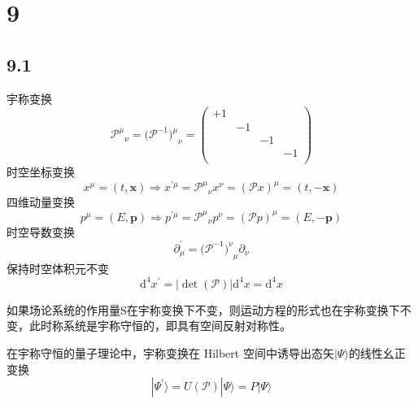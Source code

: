 \section{9}
\subsection{9.1}

宇称变换
\begin{equation}
    {\mathcal{P} ^{\mu}}_{\nu}=(\mathcal{P} ^{-1}{)^{\mu}}_{\nu}=\left( \begin{matrix}
	+1&		&		&		\\
	&		-1&		&		\\
	&		&		-1&		\\
	&		&		&		-1\\
\end{matrix} \right) 
\end{equation}
时空坐标变换
\begin{equation}
    x^{\mu}=\left( t,\mathbf{x} \right) \Rightarrow x^{\prime \mu}={\mathcal{P} ^{\mu}}_{\nu}x^{\nu}=(\mathcal{P} x)^{\mu}=\left( t,-\mathbf{x} \right) 
\end{equation}
四维动量变换
\begin{equation}
    p^{\mu}=\left( E,\mathbf{p} \right) \Rightarrow p^{\prime \mu}={\mathcal{P} ^{\mu}}_{\nu}p^{\nu}=(\mathcal{P} p)^{\mu}=\left( E,-\mathbf{p} \right) 
\end{equation}
时空导数变换
\begin{equation}
    \partial _{\mu}^{\prime}=(\mathcal{P} ^{-1}{)^{\nu}}_{\mu}\partial _{\nu}
\end{equation}
保持时空体积元不变
\begin{equation}
    \mathrm{d}^4x^{\prime}=\left| \det \left( \mathcal{P} \right) \right|\mathrm{d}^4x=\mathrm{d}^4x
\end{equation}

如果场论系统的作用量S在宇称变换下不变，则运动方程的形式也在宇称变换下不变，此时称系统是宇称守恒的，即具有空间反射对称性。


在宇称守恒的量子理论中，宇称变换在 Hilbert 空间中诱导出态矢$|\Psi \rangle$的线性幺正变换
\begin{equation}
    |\Psi ^{\prime}\rangle =U(\mathcal{P} )|\Psi \rangle =P|\Psi \rangle 
\end{equation}





